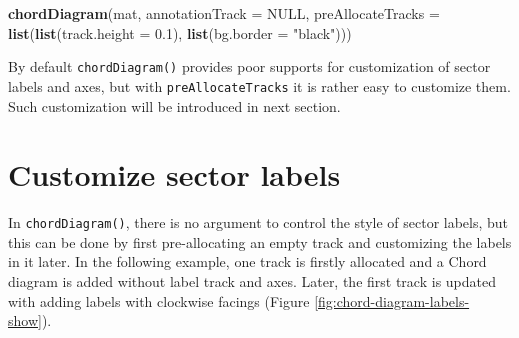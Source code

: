 \documentclass[]{book}
\newenvironment{Shaded}{\begin{snugshade}}{\end{snugshade}}
\newcommand{\KeywordTok}[1]{\textcolor[rgb]{0.13,0.29,0.53}{\textbf{#1}}}
\newcommand{\DataTypeTok}[1]{\textcolor[rgb]{0.13,0.29,0.53}{#1}}
\newcommand{\DecValTok}[1]{\textcolor[rgb]{0.00,0.00,0.81}{#1}}
\newcommand{\FloatTok}[1]{\textcolor[rgb]{0.00,0.00,0.81}{#1}}
\newcommand{\StringTok}[1]{\textcolor[rgb]{0.31,0.60,0.02}{#1}}
\newcommand{\CommentTok}[1]{\textcolor[rgb]{0.56,0.35,0.01}{\textit{#1}}}
\newcommand{\OtherTok}[1]{\textcolor[rgb]{0.56,0.35,0.01}{#1}}
\newcommand{\ControlFlowTok}[1]{\textcolor[rgb]{0.13,0.29,0.53}{\textbf{#1}}}
\newcommand{\OperatorTok}[1]{\textcolor[rgb]{0.81,0.36,0.00}{\textbf{#1}}}
\newcommand{\NormalTok}[1]{#1}
\begin{document}
\begin{Shaded}
\begin{Highlighting}[]
\KeywordTok{chordDiagram}\NormalTok{(mat, }\DataTypeTok{annotationTrack =} \OtherTok{NULL}\NormalTok{,}
    \DataTypeTok{preAllocateTracks =} \KeywordTok{list}\NormalTok{(}\KeywordTok{list}\NormalTok{(}\DataTypeTok{track.height =} \FloatTok{0.1}\NormalTok{),}
                             \KeywordTok{list}\NormalTok{(}\DataTypeTok{bg.border =} \StringTok{"black"}\NormalTok{)))}
\end{Highlighting}
\end{Shaded}

By default \texttt{chordDiagram()} provides poor supports for
customization of sector labels and axes, but with
\texttt{preAllocateTracks} it is rather easy to customize them. Such
customization will be introduced in next section.

\section{Customize sector labels}\label{customize-sector-labels}

In \texttt{chordDiagram()}, there is no argument to control the style of
sector labels, but this can be done by first pre-allocating an empty
track and customizing the labels in it later. In the following example,
one track is firstly allocated and a Chord diagram is added without
label track and axes. Later, the first track is updated with adding
labels with clockwise facings (Figure
\ref{fig:chord-diagram-labels-show}).

\begin{Shaded}
\end{Shaded}
\end{document}
